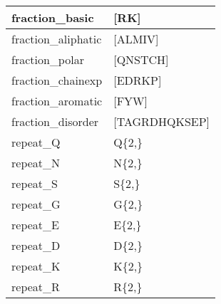 \begin{landscape}
\begin{longtable}{|l|l|}
\hline
fraction\_basic        & {[}RK]                                                                                                                     \\
\hline
fraction\_aliphatic    & {[}ALMIV]                                                                                                                  \\
\hline
fraction\_polar        & {[}QNSTCH]                                                                                                                 \\
\hline
fraction\_chainexp     & {[}EDRKP]                                                                                                                  \\
\hline
fraction\_aromatic     & {[}FYW]                                                                                                                    \\
\hline
fraction\_disorder     & {[}TAGRDHQKSEP]                                                                                                            \\
\hline
repeat\_Q              & Q\{2,\}                                                                                                                    \\
\hline
repeat\_N              & N\{2,\}                                                                                                                    \\
\hline
repeat\_S              & S\{2,\}                                                                                                                    \\
\hline
repeat\_G              & G\{2,\}                                                                                                                    \\
\hline
repeat\_E              & E\{2,\}                                                                                                                    \\
\hline
repeat\_D              & D\{2,\}                                                                                                                    \\
\hline
repeat\_K              & K\{2,\}                                                                                                                    \\
\hline
repeat\_R              & R\{2,\}                                                                                                                    \\

\end{longtable}
\end{landscape}

